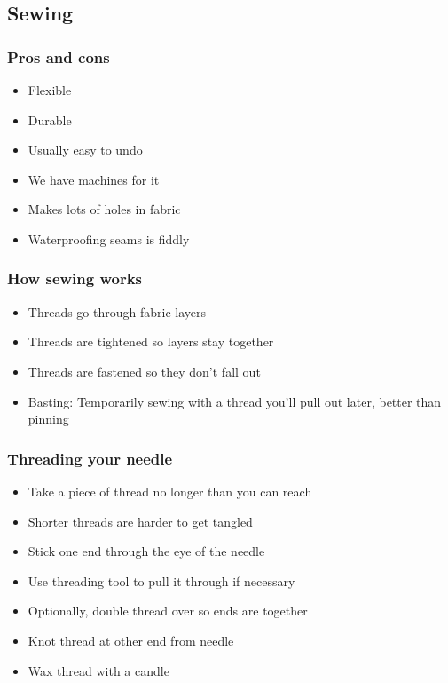 \documentclass{beamer}
\begin{document}
\subsection{Sewing}

\begin{frame}[fragile]
\tableofcontents[currentsubsection]
\end{frame}


\begin{frame}[fragile]
\frametitle{Pros and cons}
\begin{itemize}
\item Flexible
\item Durable
\item Usually easy to undo
\item We have machines for it
\item Makes lots of holes in fabric
\item Waterproofing seams is fiddly
\end{itemize}
\end{frame}

\begin{frame}[fragile]
\frametitle{How sewing works}
\begin{itemize}
\item Threads go through fabric layers
\item Threads are tightened so layers stay together
\item Threads are fastened so they don't fall out
\item Basting: Temporarily sewing with a thread you'll pull out later, better than pinning
\end{itemize}
\end{frame}

\begin{frame}[fragile]
\frametitle{Threading your needle}
\begin{itemize}
\item Take a piece of thread no longer than you can reach
\item Shorter threads are harder to get tangled
\item Stick one end through the eye of the needle
\item Use threading tool to pull it through if necessary
\item Optionally, double thread over so ends are together
\item Knot thread at other end from needle
\item Wax thread with a candle
\end{itemize}
\end{frame}
\end{document}
